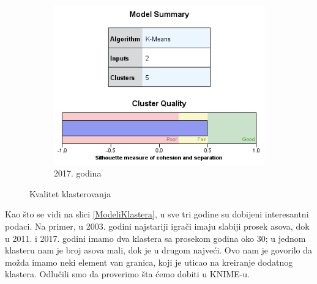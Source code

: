 \documentclass[a4paper]{article}
\begin{document}
\begin{figure}[H]
	\vspace{0.5cm}
	\begin{subfigure}[h]{\textwidth}
		\begin{center}
			\includegraphics[scale=0.50]{Klasterovanje/Model_KMeans2017_Silhouette.png}
		\end{center}
		\caption{2017. godina}
		\label{fig:SPSS_Silueta2017}
	\end{subfigure}
	
	\caption{Kvalitet klasterovanja}
	\label{Siluete}
\end{figure}

Kao što se vidi na slici \ref{ModeliKlastera}, u sve tri godine su dobijeni interesantni podaci. Na primer, u 2003. godini najstariji igrači imaju slabiji prosek asova, dok u 2011. i 2017. godini imamo dva klastera sa prosekom godina oko 30; u jednom klasteru nam je broj asova mali, dok je u drugom najveći. Ovo nam je govorilo da možda imamo neki element van granica, koji je uticao na kreiranje dodatnog klastera. Odlučili smo da proverimo šta ćemo dobiti u KNIME-u.
\end{document}
